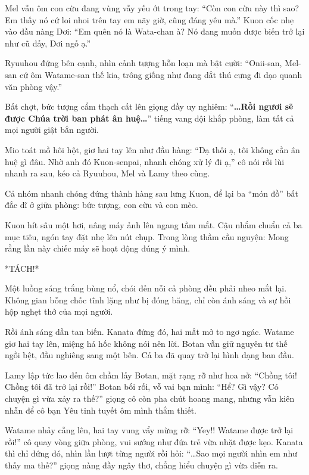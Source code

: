 \documentclass[../main.tex]{subfiles}
\begin{document}
Mel vẫn ôm con cừu đang vùng vẫy yếu ớt trong tay: ``Còn con cừu này thì sao? Em thấy nó cứ loi nhoi trên tay em nãy giờ, cũng đáng yêu mà.'' Kuon cốc nhẹ vào đầu nàng Dơi: ``Em quên nó là Wata-chan à? Nó đang muốn được biến trở lại như cũ đấy, Dơi ngố ạ.''

Ryuuhou đứng bên cạnh, nhìn cảnh tượng hỗn loạn mà bật cười: ``Onii-san, Mel-san cứ ôm Watame-san thế kia, trông giống như đang dắt thú cưng đi dạo quanh văn phòng vậy.''

Bất chợt, bức tượng cẩm thạch cất lên giọng đầy uy nghiêm: ``\textbf{\dots Rồi ngươi sẽ được Chúa trời ban phát ân huệ\dots}'' tiếng vang dội khắp phòng, làm tất cả mọi người giật bắn người.

Mio toát mồ hôi hột, giơ hai tay lên như đầu hàng: ``Dạ thôi ạ, tôi không cần ân huệ gì đâu. Nhờ anh đó Kuon-senpai, nhanh chóng xử lý đi ạ,'' cô nói rồi lùi nhanh ra sau, kéo cả Ryuuhou, Mel và Lamy theo cùng.

Cả nhóm nhanh chóng đứng thành hàng sau lưng Kuon, để lại ba ``món đồ'' bất đắc dĩ ở giữa phòng: bức tượng, con cừu và con mèo.

Kuon hít sâu một hơi, nâng máy ảnh lên ngang tầm mắt. Cậu nhắm chuẩn cả ba mục tiêu, ngón tay đặt nhẹ lên nút chụp. Trong lòng thầm cầu nguyện: Mong rằng lần này chiếc máy sẽ hoạt động đúng ý mình.

*TÁCH!*

Một luồng sáng trắng bùng nổ, chói đến nỗi cả phòng đều phải nheo mắt lại. Không gian bỗng chốc tĩnh lặng như bị đóng băng, chỉ còn ánh sáng và sự hồi hộp nghẹt thở của mọi người.

Rồi ánh sáng dần tan biến. Kanata đứng đó, hai mắt mở to ngơ ngác. Watame giơ hai tay lên, miệng há hốc không nói nên lời. Botan vẫn giữ nguyên tư thế ngồi bệt, đầu nghiêng sang một bên. Cả ba đã quay trở lại hình dạng ban đầu.

Lamy lập tức lao đến ôm chầm lấy Botan, mặt rạng rỡ như hoa nở: ``Chồng tôi! Chồng tôi đã trở lại rồi!'' Botan bối rối, vỗ vai bạn mình: ``Hể? Gì vậy? Có chuyện gì vừa xảy ra thế?'' giọng cô còn pha chút hoang mang, nhưng vẫn kiên nhẫn để cô bạn Yêu tinh tuyết ôm mình thắm thiết.

Watame nhảy cẫng lên, hai tay vung vẩy mừng rỡ: ``Yey!! Watame được trở lại rồi!'' cô quay vòng giữa phòng, vui sướng như đứa trẻ vừa nhặt được kẹo. Kanata thì chỉ đứng đó, nhìn lần lượt từng người rồi hỏi: ``\dots Sao mọi người nhìn em như thấy ma thế?'' giọng nàng đầy ngây thơ, chẳng hiểu chuyện gì vừa diễn ra.
\end{document}
